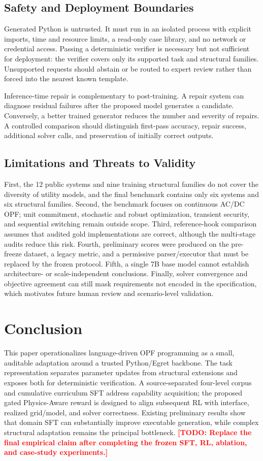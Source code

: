 \documentclass[lettersize,journal]{IEEEtran}
\newcommand{\drafttodo}[1]{\textcolor{red}{\textbf{[TODO: #1]}}}
\begin{document}
\subsection{Safety and Deployment Boundaries}
Generated Python is untrusted. It must run in an isolated process with explicit imports, time and resource limits, a read-only case library, and no network or credential access. Passing a deterministic verifier is necessary but not sufficient for deployment: the verifier covers only its supported task and structural families. Unsupported requests should abstain or be routed to expert review rather than forced into the nearest known template.

Inference-time repair is complementary to post-training. A repair system can diagnose residual failures after the proposed model generates a candidate. Conversely, a better trained generator reduces the number and severity of repairs. A controlled comparison should distinguish first-pass accuracy, repair success, additional solver calls, and preservation of initially correct outputs.

\subsection{Limitations and Threats to Validity}
First, the 12 public systems and nine training structural families do not cover the diversity of utility models, and the final benchmark contains only six systems and six structural families. Second, the benchmark focuses on continuous AC/DC OPF; unit commitment, stochastic and robust optimization, transient security, and sequential switching remain outside scope. Third, reference-hook comparison assumes that audited gold implementations are correct, although the multi-stage audits reduce this risk. Fourth, preliminary scores were produced on the pre-freeze dataset, a legacy metric, and a permissive parser/executor that must be replaced by the frozen protocol. Fifth, a single 7B base model cannot establish architecture- or scale-independent conclusions. Finally, solver convergence and objective agreement can still mask requirements not encoded in the specification, which motivates future human review and scenario-level validation.

\section{Conclusion}
This paper operationalizes language-driven OPF programming as a small, auditable adaptation around a trusted Python/Egret backbone. The task representation separates parameter updates from structural extensions and exposes both for deterministic verification. A source-separated four-level corpus and cumulative curriculum SFT address capability acquisition; the proposed gated Physics-Aware reward is designed to align subsequent RL with interface, realized grid/model, and solver correctness. Existing preliminary results show that domain SFT can substantially improve executable generation, while complex structural adaptation remains the principal bottleneck. \drafttodo{Replace the final empirical claim after completing the frozen SFT, RL, ablation, and case-study experiments.}
\end{document}
